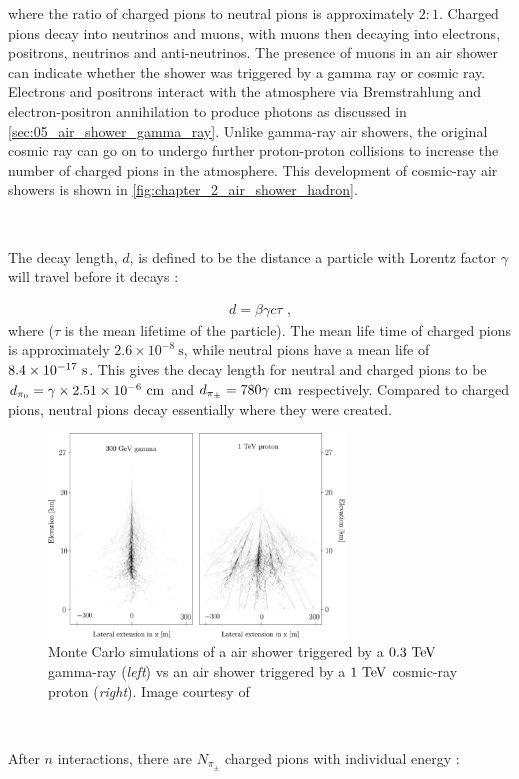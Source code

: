 \noindent where the ratio of charged pions to neutral pions is approximately $2:1$. Charged pions decay into neutrinos and muons, with muons then decaying into electrons, positrons, neutrinos and anti-neutrinos. The presence of muons in an air shower can indicate whether the shower was triggered by a gamma ray or cosmic ray. Electrons and positrons interact with the atmosphere via Bremstrahlung and electron-positron annihilation to produce photons as discussed in \autoref{sec:05_air_shower_gamma_ray}. Unlike gamma-ray air showers, the original cosmic ray can go on to undergo further proton-proton collisions to increase the number of charged pions in the atmosphere. This development of cosmic-ray air showers is shown in \autoref{fig:chapter_2_air_shower_hadron}.
\par~\par
The decay length, $d$, is defined to be the distance a particle with Lorentz factor $\gamma$ will travel before it decays \citep{MATTHEWS2005387}:

\begin{equation}
    \begin{aligned}
    d=\beta \gamma c \tau \text{ ,}
    \end{aligned}
\end{equation}
\noindent where ($\tau$ is the mean lifetime of the particle). The mean life time of charged pions is approximately $2.6\times 10^{-8}~\si{\second}$, while neutral pions have a mean life of $8.4\times 10^{-17}~\si{\second}$. This gives the decay length for neutral and charged pions to be $d_{\pi_0}=\gamma \times  2.51 \times 10^{-6}~\si{\centi\meter}$ and $d_{\pi_\pm}= 780\gamma~\si{\centi\meter}$ respectively. Compared to charged pions, neutral pions decay essentially where they were created.
\begin{figure}
    \centering
    \includegraphics[width=0.7\textwidth]{05_Astronomy/Images/air_shower/cosmic_ray_vs_gamma_ray2.png}
    \caption{Monte Carlo simulations of a air shower triggered by a $0.3~\TeV$ gamma-ray (\textit{left}) vs an air shower triggered by a $1~\TeV$ cosmic-ray proton (\textit{right}). Image courtesy of \citep{2008RPPh...71i6901A}}
    \label{fig:chapter_2_air_shower2}
\end{figure}
\par~\par 
After $n$ interactions, there are $N_{\pi_\pm}$ charged pions with individual energy \citep{MATTHEWS2005387}:

